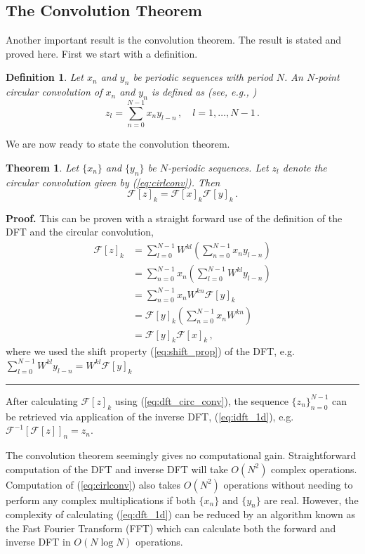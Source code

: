 \documentclass[12pt]{CSUNthesis}
\newtheorem{theorem}{Theorem}
\newtheorem{definition}{Definition}
\newenvironment{proof}[1][Proof]{\noindent\textbf{#1.} }{\newline \hspace*{\textwidth}\hspace*{-0,4cm} \rule{0.5em}{0.5em} \vspace{0,2cm}}
\def\calF{\mathcal{F}}
\begin{document}
\subsection{The Convolution Theorem}
Another important result is the convolution theorem. The result is stated and proved here. First we start with a definition.
\begin{definition}
Let $x_{n}$ and $y_{n}$ be periodic sequences with period $N$. An $N$-point circular 
convolution of $x_{n}$ and $y_{n}$ is defined as (see, e.g., \cite{Nussbaumer1982})
\begin{equation}
\label{eq:cirlconv}
z_{l}=\sum_{n=0}^{N-1} x_{n}y_{l-n}\, ,  \quad l=1,\dots,N-1 \, .
\end{equation} 
\end{definition}
We are now ready to state the convolution theorem.
\begin{theorem}
Let $\{x_n\}$ and $\{y_n\}$ be $N$-periodic sequences. Let $z_l$ denote the circular convolution given by (\ref{eq:cirlconv}). Then
\begin{equation}
\label{eq:dft_circ_conv}
\calF[z]_{k}=\calF[x]_{k}\calF[y]_{k}\, .
\end{equation}
\end{theorem}
\begin{proof}
This can be proven with a straight forward use of the definition of the DFT and the circular convolution,
\begin{align*}
\calF[z]_k &= \sum_{l=0}^{N-1} W^{kl} \left( \sum_{n=0}^{N-1} x_n y_{l-n} \right) \\
&= \sum_{n=0}^{N-1} x_n \left( \sum_{l=0}^{N-1} W^{kl} y_{l-n} \right) \\
&= \sum_{n=0}^{N-1} x_n W^{kn} \calF[y]_k \\
&= \calF[y]_k \left( \sum_{n=0}^{N-1} x_n W^{kn}\right)\\
&= \calF[y]_k \calF[x]_k \, ,
\end{align*}
where we used the shift property (\ref{eq:shift_prop}) of the DFT, e.g. $\sum_{l=0}^{N-1} W^{kl} y_{l-n} = W^{kl} \calF[y]_k$
\end{proof}
After calculating $\calF[z]_k$ using (\ref{eq:dft_circ_conv}), the sequence $\{z_n\}_{n=0}^{N-1}$ can be retrieved via application of the inverse DFT, (\ref{eq:idft_1d}), e.g. $\calF^{-1}[\calF[z]]_n = z_n$. 


The convolution theorem seemingly gives no computational gain. Straightforward computation of the DFT and inverse DFT will take $O(N^2)$ complex operations. Computation of (\ref{eq:cirlconv}) also takes $O(N^2)$ operations without needing to perform any complex multiplications if both $\{x_n\}$ and $\{y_n\}$ are real. However, the complexity of calculating (\ref{eq:dft_1d}) can be reduced by an algorithm known as the Fast Fourier Transform (FFT) which can calculate both the forward and inverse DFT in $O(N \log N)$ operations.
\end{document}
